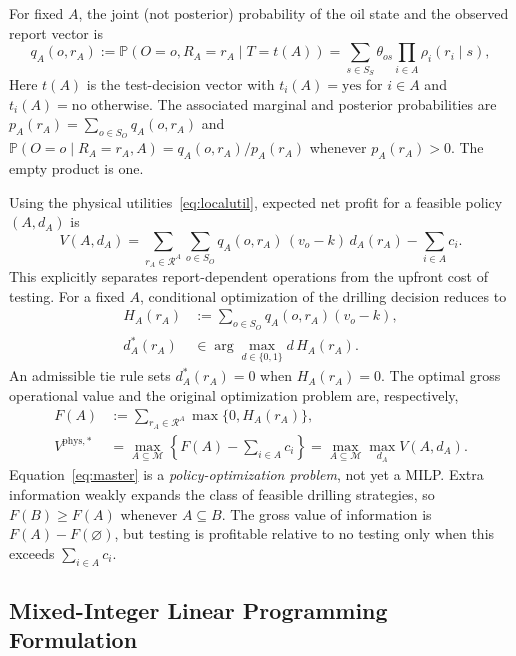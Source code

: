 \documentclass[11pt,a4paper]{article}
\newcommand{\Prob}{\mathbb{P}}
\newcommand{\calM}{\mathcal{M}}
\newcommand{\calR}{\mathcal{R}}
\begin{document}
For fixed $A$, the joint (not posterior) probability of the oil state
and the observed report vector is
\begin{equation}\label{eq:joint}
 q_A(o,r_A):=\Prob(O=o,R_A=r_A\mid T=t(A))
 =\sum_{s\in S_S}\theta_{os}
   \prod_{i\in A}\rho_i(r_i\mid s),
\end{equation}
Here $t(A)$ is the test-decision vector with $t_i(A)=\mathrm{yes}$
for $i\in A$ and $t_i(A)=\mathrm{no}$ otherwise.
The associated marginal and posterior probabilities are
$p_A(r_A)=\sum_{o\in S_O}q_A(o,r_A)$ and
$\Prob(O=o\mid R_A=r_A,A)=q_A(o,r_A)/p_A(r_A)$ whenever
$p_A(r_A)>0$.  The empty product is one.

Using the physical utilities~\eqref{eq:localutil}, expected net profit
for a feasible policy $(A,d_A)$ is
\begin{equation}\label{eq:policyvalue}
 V(A,d_A)
  =\sum_{r_A\in\calR^A}\sum_{o\in S_O}
       q_A(o,r_A)\,(v_o-k)\,d_A(r_A)
       -\sum_{i\in A}c_i.
\end{equation}
This explicitly separates report-dependent operations from the
upfront cost of testing.  For a fixed $A$, conditional optimization of
the drilling decision reduces to
\begin{align}
 H_A(r_A)&:=\sum_{o\in S_O}q_A(o,r_A)(v_o-k),\label{eq:H}\\
 d_A^*(r_A)&\in\arg\max_{d\in\{0,1\}}d\,H_A(r_A).\label{eq:drill}
\end{align}
An admissible tie rule sets $d_A^*(r_A)=0$ when $H_A(r_A)=0$.
The optimal gross operational value and the original optimization
problem are, respectively,
\begin{align}
 F(A)&:=\sum_{r_A\in\calR^A}\max\{0,H_A(r_A)\},\label{eq:oracle}\\
 V^{\mathrm{phys},*}
 &=\max_{A\subseteq\calM}\left\{F(A)-\sum_{i\in A}c_i\right\}
 =\max_{A\subseteq\calM}\max_{d_A}V(A,d_A).\label{eq:master}
\end{align}
Equation~\eqref{eq:master} is a \emph{policy-optimization problem},
not yet a MILP.  Extra information weakly expands the class of feasible
drilling strategies, so $F(B)\ge F(A)$ whenever $A\subseteq B$.
The gross value of information is $F(A)-F(\varnothing)$, but testing
is profitable relative to no testing only when this exceeds
$\sum_{i\in A}c_i$.

\subsection{Mixed-Integer Linear Programming Formulation}\label{sec:milp}
\end{document}
